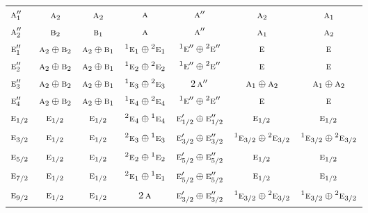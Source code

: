 \documentclass[10pt,a4paper]{article}
\numberwithin{equation}{section}
\newcommand{\irr}[1]{\text{\normalfont\scshape #1}}
\newcommand{\conjpair}[1]{{}^{#1}}
\begin{document}
{\begin{longtable}{@{}lcccccc@{}}
$\irr{a}_{1}''$ & $\irr{a}_{2}$ & $\irr{a}_{2}$ & $\irr{a}$ & $\irr{a}''$ & $\irr{a}_{2}$ & $\irr{a}_{1}$\\
$\irr{a}_{2}''$ & $\irr{b}_{2}$ & $\irr{b}_{1}$ & $\irr{a}$ & $\irr{a}''$ & $\irr{a}_{1}$ & $\irr{a}_{2}$\\
$\irr{e}_{1}''$ & $\irr{a}_{2}\oplus \irr{b}_{2}$ & $\irr{a}_{2}\oplus \irr{b}_{1}$ & $\conjpair{1}\irr{e}_{1}\oplus \conjpair{2}\irr{e}_{1}$ & $\conjpair{1}\irr{e}''\oplus \conjpair{2}\irr{e}''$ & $\irr{e}$ & $\irr{e}$\\
$\irr{e}_{2}''$ & $\irr{a}_{2}\oplus \irr{b}_{2}$ & $\irr{a}_{2}\oplus \irr{b}_{1}$ & $\conjpair{1}\irr{e}_{2}\oplus \conjpair{2}\irr{e}_{2}$ & $\conjpair{1}\irr{e}''\oplus \conjpair{2}\irr{e}''$ & $\irr{e}$ & $\irr{e}$\\
$\irr{e}_{3}''$ & $\irr{a}_{2}\oplus \irr{b}_{2}$ & $\irr{a}_{2}\oplus \irr{b}_{1}$ & $\conjpair{1}\irr{e}_{3}\oplus \conjpair{2}\irr{e}_{3}$ & $2\,\irr{a}''$ & $\irr{a}_{1}\oplus \irr{a}_{2}$ & $\irr{a}_{1}\oplus \irr{a}_{2}$\\
$\irr{e}_{4}''$ & $\irr{a}_{2}\oplus \irr{b}_{2}$ & $\irr{a}_{2}\oplus \irr{b}_{1}$ & $\conjpair{1}\irr{e}_{4}\oplus \conjpair{2}\irr{e}_{4}$ & $\conjpair{1}\irr{e}''\oplus \conjpair{2}\irr{e}''$ & $\irr{e}$ & $\irr{e}$\\
$\irr{e}_{1/2}$ & $\irr{e}_{1/2}$ & $\irr{e}_{1/2}$ & $\conjpair{2}\irr{e}_{4}\oplus \conjpair{1}\irr{e}_{4}$ & $\irr{e}_{1/2}'\oplus \irr{e}_{1/2}''$ & $\irr{e}_{1/2}$ & $\irr{e}_{1/2}$\\
$\irr{e}_{3/2}$ & $\irr{e}_{1/2}$ & $\irr{e}_{1/2}$ & $\conjpair{2}\irr{e}_{3}\oplus \conjpair{1}\irr{e}_{3}$ & $\irr{e}_{3/2}'\oplus \irr{e}_{3/2}''$ & $\conjpair{1}\irr{e}_{3/2}\oplus \conjpair{2}\irr{e}_{3/2}$ & $\conjpair{1}\irr{e}_{3/2}\oplus \conjpair{2}\irr{e}_{3/2}$\\
$\irr{e}_{5/2}$ & $\irr{e}_{1/2}$ & $\irr{e}_{1/2}$ & $\conjpair{2}\irr{e}_{2}\oplus \conjpair{1}\irr{e}_{2}$ & $\irr{e}_{5/2}'\oplus \irr{e}_{5/2}''$ & $\irr{e}_{1/2}$ & $\irr{e}_{1/2}$\\
$\irr{e}_{7/2}$ & $\irr{e}_{1/2}$ & $\irr{e}_{1/2}$ & $\conjpair{2}\irr{e}_{1}\oplus \conjpair{1}\irr{e}_{1}$ & $\irr{e}_{5/2}'\oplus \irr{e}_{5/2}''$ & $\irr{e}_{1/2}$ & $\irr{e}_{1/2}$\\
$\irr{e}_{9/2}$ & $\irr{e}_{1/2}$ & $\irr{e}_{1/2}$ & $2\,\irr{a}$ & $\irr{e}_{3/2}'\oplus \irr{e}_{3/2}''$ & $\conjpair{1}\irr{e}_{3/2}\oplus \conjpair{2}\irr{e}_{3/2}$ & $\conjpair{1}\irr{e}_{3/2}\oplus \conjpair{2}\irr{e}_{3/2}$\\

\end{longtable}}
\end{document}
